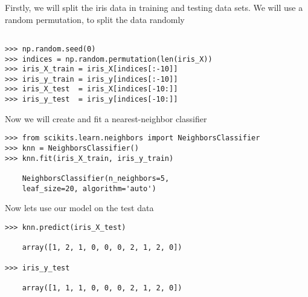 \documentclass[SKL-MASTER.tex]{subfiles}
\begin{document}
\noindent Firstly, we will split the iris data in training and testing data sets.
We will use a random permutation, to split the data randomly
\begin{framed}
\begin{verbatim}

>>> np.random.seed(0)
>>> indices = np.random.permutation(len(iris_X))
>>> iris_X_train = iris_X[indices[:-10]]
>>> iris_y_train = iris_y[indices[:-10]]
>>> iris_X_test  = iris_X[indices[-10:]]
>>> iris_y_test  = iris_y[indices[-10:]]
\end{verbatim}
\end{framed}
Now we will create and fit a nearest-neighbor classifier
{\large
	\begin{framed}
	\begin{verbatim}
>>> from scikits.learn.neighbors import NeighborsClassifier
>>> knn = NeighborsClassifier()
>>> knn.fit(iris_X_train, iris_y_train)

	NeighborsClassifier(n_neighbors=5, 
	leaf_size=20, algorithm='auto')
\end{verbatim}
\end{framed}
}
Now lets use our model on the test data
\begin{framed}
	\begin{verbatim}
>>> knn.predict(iris_X_test)

	array([1, 2, 1, 0, 0, 0, 2, 1, 2, 0])

>>> iris_y_test

	array([1, 1, 1, 0, 0, 0, 2, 1, 2, 0])
\end{verbatim}
\end{framed}
\end{document}
